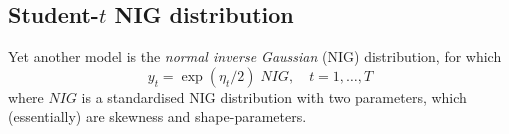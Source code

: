\documentclass[a4paper,11pt]{article}
\begin{document}
\subsection*{Student-$t$  NIG distribution}

Yet another model is the \emph{normal inverse Gaussian} (NIG)
distribution, for which
\begin{equation}\label{eq4}%
    y_{t} = \exp(\eta_{t}/2)\; NIG, \quad t=1,\ldots, T
\end{equation}
where $NIG$ is a standardised NIG distribution with two parameters,
which (essentially) are skewness and shape-parameters.

\small \newpage
\end{document}
